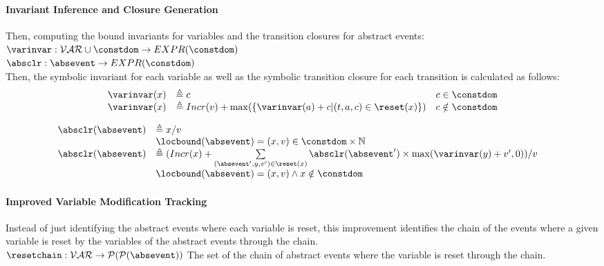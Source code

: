 \paragraph*{Invariant Inference and Closure Generation }
Then, computing the bound invariants for variables and the transition closures for abstract events:
\\ 
$ \varinvar: \mathcal{VAR} \cup \constdom \to EXPR(\constdom)$
\\
$\absclr: \absevent \to EXPR(\constdom)$
\\
Then, the symbolic invariant for each variable 
as well as the symbolic transition closure for each transition is calculated as follows:
\[ 
\begin{array}{lll}
  \varinvar(x) & \triangleq c & c \in \constdom \\
  \varinvar(x) & \triangleq Incr(v) + \max(\{\varinvar(a) + c | (t, a, c) \in \reset(x)\}) & c \notin \constdom
\end{array}
\]
%
\begin{defn}
  \label{def:transition_closure_base}
\[ 
\begin{array}{lll}
  \absclr(\absevent) 
  & \triangleq x / v & \\ 
  & \locbound(\absevent) = (x, v) \in \constdom \times \mathbb{N} & \\
  \absclr(\absevent) 
  & \triangleq (Incr(x) + 
  \sum\limits_{(\absevent', y, v') \in \reset(x)}
  \absclr(\absevent') \times \max(\varinvar(y) + v', 0) ) / v & \\
  & \locbound(\absevent) = (x, v) \land x \notin \constdom & 
\end{array}
  \]
\end{defn}
%
\paragraph*{Improved Variable Modification Tracking}
Instead of just identifying the abstract events where each variable is reset,
this improvement identifies the chain of the events where a given variable is reset by the 
variables of the abstract events through the chain.
\\
$\resetchain: \mathcal{VAR} \to \mathcal{P}(\mathcal{P}(\absevent)) $
The set of the chain of abstract events where the variable is reset through the chain.
%
